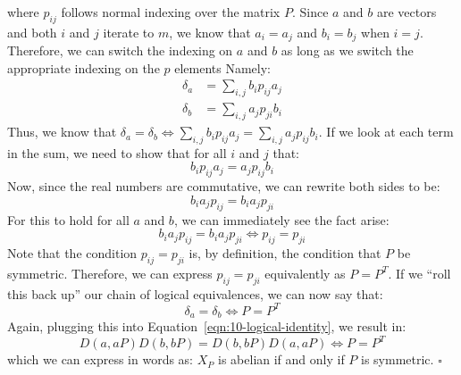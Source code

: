 \documentclass[letterpaper]{article}
\newcommand*{\QED}{\hfill\ensuremath{\square}}%
\begin{document}
where $ p_{ij} $ follows normal indexing over the matrix $ P $.
Since $ a $ and $ b $ are vectors and both $ i $ and $ j $ iterate to $ m $, we know that $ a_i = a_j $ and $ b_i = b_j $ when $ i = j $.
Therefore, we can switch the indexing on $ a $ and $ b $ as long as we switch the appropriate indexing on the $ p $ elements
Namely:
\begin{align}
    \delta_a &= \sum_{i, j} b_i p_{ij} a_j \\
    \delta_b &= \sum_{i, j} a_j p_{ji} b_i
\end{align}
Thus, we know that $ \delta_a = \delta_b \iff \sum_{i, j} b_i p_{ij} a_j = \sum_{i, j} a_j p_{ij} b_i $.
If we look at each term in the sum, we need to show that for all $ i $ and $ j $ that:
\[
b_i p_{ij} a_j = a_j p_{ij} b_i
\]
Now, since the real numbers are commutative, we can rewrite both sides to be:
\[
b_i a_j p_{ij} = b_i a_j p_{ji}
\]
For this to hold for all $ a $ and $ b $, we can immediately see the fact arise:
\[
b_i a_j p_{ij} = b_i a_j p_{ji} \iff p_{ij} = p_{ji}
\]
Note that the condition $ p_{ij} = p_{ji} $ is, by definition, the condition that $ P $ be symmetric.
Therefore, we can express $ p_{ij} = p_{ji} $ equivalently as $ P = P^T $.
If we ``roll this back up'' our chain of logical equivalences, we can now say that:
\[
\delta_a = \delta_b \iff P = P^T
\]
Again, plugging this into Equation~\ref{eqn:10-logical-identity}, we result in:
\[
D(a, aP)D(b, bP) = D(b, bP) D(a, aP) \iff P = P^T
\]
which we can express in words as:
$ X_P $ is abelian if and only if $ P $ is symmetric.
\QED{}
\end{document}
